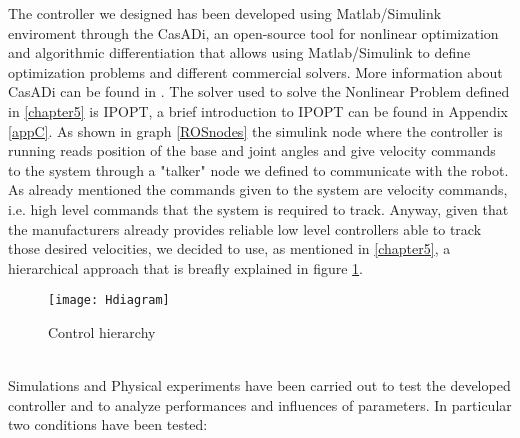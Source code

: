 The controller we designed has been developed using Matlab/Simulink enviroment through the CasADi, an open-source tool for nonlinear optimization and algorithmic differentiation that allows using Matlab/Simulink to define optimization problems and different commercial solvers. More information about CasADi can be found in \cite{Andersson2018}. The solver used to solve the Nonlinear Problem defined in \ref{chapter5} is IPOPT, a brief introduction to IPOPT can be found in Appendix \ref{appC}. As shown in graph \ref{ROSnodes} the simulink node where the controller is running reads position of the base and joint angles and give velocity commands to the system through a "talker" node we defined to communicate with the robot. As already mentioned the commands given to the system are velocity commands, i.e. high level commands that the system is required to track. Anyway, given that the manufacturers already provides reliable low level controllers able to track those desired velocities, we decided to use, as mentioned in \ref{chapter5}, a hierarchical approach that is breafly explained in figure \ref{Hdiagram}.  
\begin{figure}[h!]
	\begin{center} 
		\texttt{[image: Hdiagram]}
		\centering
		\label{Hdiagram}
		\caption{Control hierarchy} 
	\end{center}
\end{figure}
\\
Simulations and Physical experiments have been carried out to test the developed controller and to analyze performances and influences of parameters. In particular two conditions have been tested: 

